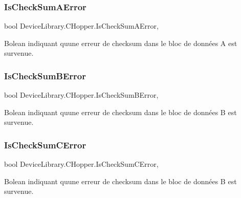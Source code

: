 \subsubsection{\texorpdfstring{Is\+Check\+Sum\+A\+Error}{IsCheckSumAError}}
{\footnotesize\ttfamily bool Device\+Library.\+C\+Hopper.\+Is\+Check\+Sum\+A\+Error\hspace{0.3cm}{\ttfamily [get]}, {\ttfamily [set]}}



Bolean indiquant qu\textquotesingle{}une erreur de checksum dans le bloc de données A est survenue. 

\mbox{\label{class_device_library_1_1_c_hopper_a97fc7f01be900cd25941c1cc0d1ff053}} 
\subsubsection{\texorpdfstring{Is\+Check\+Sum\+B\+Error}{IsCheckSumBError}}
{\footnotesize\ttfamily bool Device\+Library.\+C\+Hopper.\+Is\+Check\+Sum\+B\+Error\hspace{0.3cm}{\ttfamily [get]}, {\ttfamily [set]}}



Bolean indiquant qu\textquotesingle{}une erreur de checksum dans le bloc de données B est survenue. 

\mbox{\label{class_device_library_1_1_c_hopper_abcd01eec19d5cefaaf8f7a8a748777c1}} 
\subsubsection{\texorpdfstring{Is\+Check\+Sum\+C\+Error}{IsCheckSumCError}}
{\footnotesize\ttfamily bool Device\+Library.\+C\+Hopper.\+Is\+Check\+Sum\+C\+Error\hspace{0.3cm}{\ttfamily [get]}, {\ttfamily [set]}}



Bolean indiquant qu\textquotesingle{}une erreur de checksum dans le bloc de données B est survenue. 

